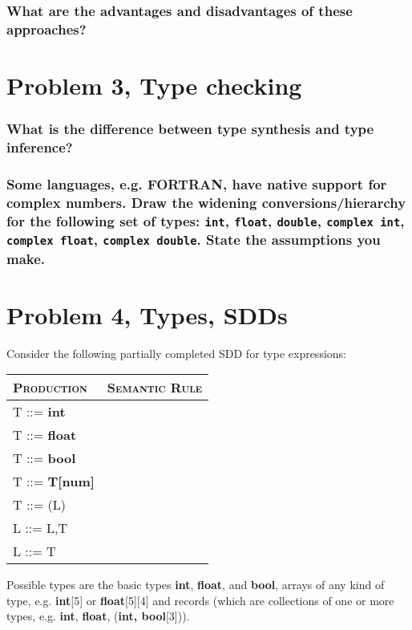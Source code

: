 \subsubsection{What are the advantages and disadvantages of these approaches?}

\newpage
\setcounter{subsubsection}{0}
\section{Problem 3, Type checking}
\subsubsection{What is the difference between type synthesis and type inference?}

\subsubsection{Some languages, e.g. FORTRAN, have native support for complex numbers. Draw the widening conversions/hierarchy for the following set of types: \texttt{int}, \texttt{float}, \texttt{double}, \texttt{complex int}, \texttt{complex float}, \texttt{complex double}. State the assumptions you make.}


\newpage
\setcounter{subsubsection}{0}
\section{Problem 4, Types, SDDs}
Consider the following partially completed SDD for type expressions:
\begin{table}[H]
\begin{tabular}{ll}
	\textsc{Production} & \textsc{Semantic Rule} \\ \hline
	T ::= \textbf{int}	&						\\
	T ::= \textbf{float}& \\
	T ::= \textbf{bool} & \\
	T ::= \textbf{T[num]}& \\
	T ::= (L) 			& \\
	L ::= L,T			& \\
	L ::= T				& \\
\end{tabular}
\end{table}

Possible types are the basic types \textbf{int}, \textbf{float}, and \textbf{bool}, arrays of any kind of type, e.g. \textbf{int}[5] or \textbf{float}[5][4] and records (which are collections of one or more types, e.g. \textbf{int}, \textbf{float}, (\textbf{int, bool}[3])).

